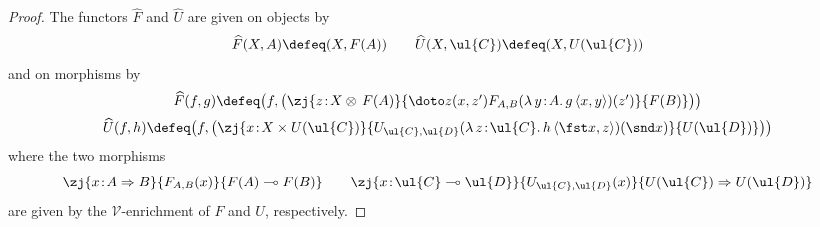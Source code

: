 \begin{proof}
The functors $\widehat{F}$ and $\widehat{U}$ are given on objects by
\[
\widehat{F}(X,A) \defeq (X,F(A))
\qquad
\widehat{U}(X,\ul{C}) \defeq (X,U(\ul{C}))
\]
and on morphisms by
\[
\begin{array}{c}
\widehat{F}(f,g) \defeq \big(f,\big(\zj {z \!:\! X \otimes\, F(A)} {\doto z {(x,z')} {} {F_{A,B}(\lambda\, y \!:\! A .\, g
\, \langle x,y \rangle)(z')}} {F(B)}\big)\big)
\\[2mm]
\widehat{U}(f,h) \defeq \big(f, \big(\zj {x \!:\! X \times U(\ul{C})} {U_{\ul{C},\ul{D}}(\lambda\, z \!:\! \ul{C} .\, h\, \langle \fst x, z \rangle)(\snd x)} {U(\ul{D})}\big)\big)
\end{array}
\]
where the two morphisms
\[
\zj {x \!:\! A \Rightarrow B} {F_{A,B}(x)} {F(A) \multimap F(B)}
\qquad
\zj {x \!:\! \ul{C} \multimap \ul{D}} {U_{\ul{C},\ul{D}}(x)} {U(\ul{C}) \Rightarrow U(\ul{D})}
\]
are given by the $\mathcal{V}$-enrichment of $F$ and $U$, respectively.


\end{proof}
